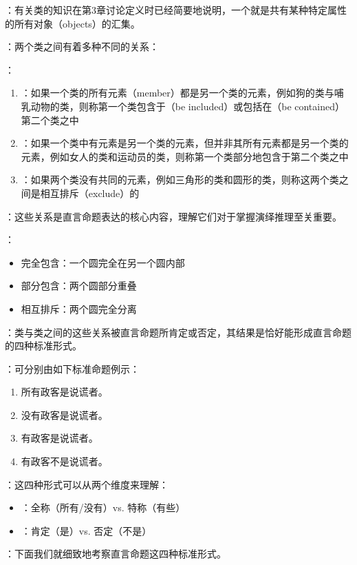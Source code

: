 \begin{theorembox}[title=类之间的关系]
：有关类的知识在第3章讨论定义时已经简要地说明，一个就是共有某种特定属性的所有对象（objects）的汇集。

：两个类之间有着多种不同的关系：

：
\begin{enumerate}
  \item {}：如果一个类的所有元素（member）都是另一个类的元素，例如狗的类与哺乳动物的类，则称第一个类包含于（be included）或包括在（be contained）第二个类之中

  \item {}：如果一个类中有元素是另一个类的元素，但并非其所有元素都是另一个类的元素，例如女人的类和运动员的类，则称第一个类部分地包含于第二个类之中

  \item {}：如果两个类没有共同的元素，例如三角形的类和圆形的类，则称这两个类之间是相互排斥（exclude）的
\end{enumerate}

：这些关系是直言命题表达的核心内容，理解它们对于掌握演绎推理至关重要。

：
\begin{itemize}
  \item 完全包含：一个圆完全在另一个圆内部
  \item 部分包含：两个圆部分重叠
  \item 相互排斥：两个圆完全分离
\end{itemize}
\end{theorembox}

\begin{theorembox}[title=直言命题的四种标准形式]
：类与类之间的这些关系被直言命题所肯定或否定，其结果是恰好能形成直言命题的四种标准形式。

：可分别由如下标准命题例示：

\begin{enumerate}
  \item 所有政客是说谎者。
  \item 没有政客是说谎者。
  \item 有政客是说谎者。
  \item 有政客不是说谎者。
\end{enumerate}

：这四种形式可以从两个维度来理解：
\begin{itemize}
  \item {}：全称（所有/没有）vs. 特称（有些）
  \item {}：肯定（是）vs. 否定（不是）
\end{itemize}

：下面我们就细致地考察直言命题这四种标准形式。
\end{theorembox}

